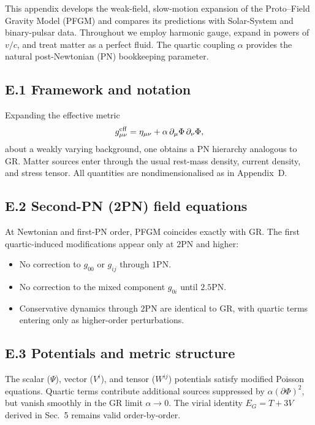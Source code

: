 \documentclass{article}
\begin{document}
This appendix develops the weak-field, slow-motion expansion of the Proto--Field Gravity Model (PFGM) and compares its predictions with Solar-System and binary-pulsar data. Throughout we employ harmonic gauge, expand in powers of $v/c$, and treat matter as a perfect fluid. The quartic coupling $\alpha$ provides the natural post-Newtonian (PN) bookkeeping parameter.

\subsection*{E.1 Framework and notation}
Expanding the effective metric
\begin{equation}
g^{\rm eff}_{\mu\nu} = \eta_{\mu\nu} + \alpha\,\partial_\mu\Phi\,\partial_\nu\Phi ,
\end{equation}
about a weakly varying background, one obtains a PN hierarchy analogous to GR. Matter sources enter through the usual rest-mass density, current density, and stress tensor. All quantities are nondimensionalised as in Appendix~D.

\subsection*{E.2 Second-PN (2PN) field equations}
At Newtonian and first-PN order, PFGM coincides exactly with GR. The first quartic-induced modifications appear only at $2$PN and higher:
\begin{itemize}
\item No correction to $g_{00}$ or $g_{ij}$ through $1$PN.
\item No correction to the mixed component $g_{0i}$ until $2.5$PN.
\item Conservative dynamics through $2$PN are identical to GR, with quartic terms entering only as higher-order perturbations.
\end{itemize}

\subsection*{E.3 Potentials and metric structure}
The scalar ($\Psi$), vector ($V^i$), and tensor ($W^{ij}$) potentials satisfy modified Poisson equations. Quartic terms contribute additional sources suppressed by $\alpha (\partial\Phi)^2$, but vanish smoothly in the GR limit $\alpha\to 0$. The virial identity $E_G = T + 3V$ derived in Sec.~5 remains valid order-by-order.
\end{document}
